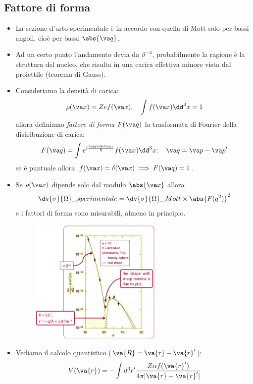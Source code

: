 \subsection{Fattore di forma}
\begin{itemize}
    \item La sezione d'urto sperimentale è in accordo con quella di Mott solo per bassi angoli, cioè per bassi $\abs{\va q}$. 
    \item Ad un certo punto l'andamento devia da $\vartheta^{-4}$, probabilmente la ragione è la struttura del nucleo, che risulta in una carica effettiva minore vista dal proiettile (teorema di Gauss).
    \item Consideriamo la densità di carica:
    \begin{equation*}
    \rho(\va x)=Zef(\va x),\quad \int f(\va x)\dd^3x=1
    \end{equation*}
    allora definiamo \textit{fattore di forma} $F(\va q)$ la trasformata di Fourier della distribuzione di carica:
    \begin{equation*}
        F(\va q)=\int e^{i\frac{\va q\vdot\va x}\hbar}f(\va x)\dd^3{x};\quad \va q=\va p-\va p'
    \end{equation*}
    se è puntuale allora $f(\va x)=\delta(\va x)\implies F(\va q)=1$.
    \item Se $\rho(\va x)$ dipende solo dal modulo $\abs{\va x}$ allora
    \begin{equation*}
        \dv{\sigma}{\Omega}\_{sperimentale}=\dv{\sigma}{\Omega}\_{Mott}\times\abs{F(q^2)}^2
    \end{equation*}
    e i fattori di forma sono misurabili, almeno in principio.
    \begin{figure}[H]
        \centering
        \includegraphics[width=0.6\textwidth]{immagini/fig_sigma_theta_en.png}
    \end{figure}
    \item Vediamo il calcolo quantistico ($\va{R} = \va{r} - \va{r}'$):
    \[
    V(\va{r}) = -\int d^3r' \frac{Z \alpha f(\va{r}')}{4 \pi |\va{r} - \va{r}'|}
    \]


\end{itemize}

